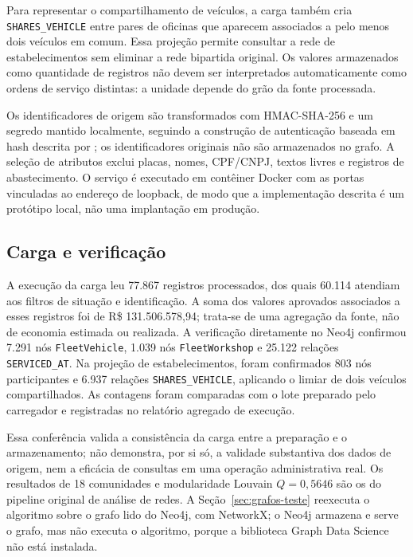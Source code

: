 Para representar o compartilhamento de veículos, a carga também cria \texttt{SHARES\_VEHICLE} entre pares de oficinas que aparecem associados a pelo menos dois veículos em comum. Essa projeção permite consultar a rede de estabelecimentos sem eliminar a rede bipartida original. Os valores armazenados como quantidade de registros não devem ser interpretados automaticamente como ordens de serviço distintas: a unidade depende do grão da fonte processada.

Os identificadores de origem são transformados com HMAC-SHA-256 e um segredo mantido localmente, seguindo a construção de autenticação baseada em hash descrita por \cite{rfc2104}; os identificadores originais não são armazenados no grafo. A seleção de atributos exclui placas, nomes, CPF/CNPJ, textos livres e registros de abastecimento. O serviço é executado em contêiner Docker com as portas vinculadas ao endereço de loopback, de modo que a implementação descrita é um protótipo local, não uma implantação em produção.

\subsection{Carga e verificação}

A execução da carga leu 77.867 registros processados, dos quais 60.114 atendiam aos filtros de situação e identificação. A soma dos valores aprovados associados a esses registros foi de R\$ 131.506.578,94; trata-se de uma agregação da fonte, não de economia estimada ou realizada. A verificação diretamente no Neo4j confirmou 7.291 nós \texttt{FleetVehicle}, 1.039 nós \texttt{FleetWorkshop} e 25.122 relações \texttt{SERVICED\_AT}. Na projeção de estabelecimentos, foram confirmados 803 nós participantes e 6.937 relações \texttt{SHARES\_VEHICLE}, aplicando o limiar de dois veículos compartilhados. As contagens foram comparadas com o lote preparado pelo carregador e registradas no relatório agregado de execução.

Essa conferência valida a consistência da carga entre a preparação e o armazenamento; não demonstra, por si só, a validade substantiva dos dados de origem, nem a eficácia de consultas em uma operação administrativa real. Os resultados de 18 comunidades e modularidade Louvain $Q=0,5646$ são os do pipeline original de análise de redes. A Seção~\ref{sec:grafos-teste} reexecuta o algoritmo sobre o grafo lido do Neo4j, com NetworkX; o Neo4j armazena e serve o grafo, mas não executa o algoritmo, porque a biblioteca Graph Data Science não está instalada.

